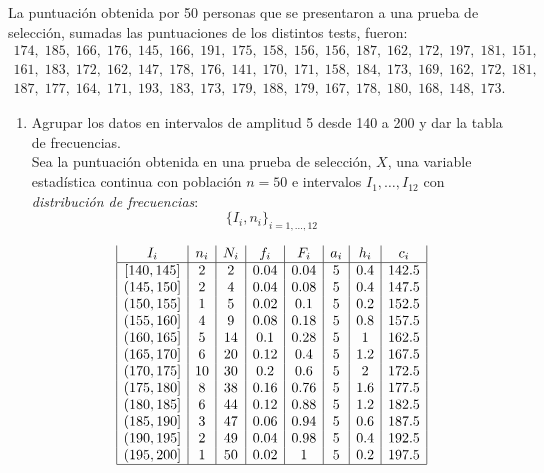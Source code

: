 \begin{ejercicio}
    La puntuación obtenida por 50 personas que se presentaron a una prueba de selección, sumadas las puntuaciones de los distintos tests, fueron:
    \begin{multline*}
        174,\;185,\;166,\;176,\;145,\;166,\;191,\;175,\;158,\;156,\;156,\;187,\;162,\;172,\;197,\;181,\;151,\;\\
        161,\;183,\;172,\;162,\;147,\;178,\;176,\;141,\;170,\;171,\;158,\;184,\;173,\;169,\;162,\;172,\;181,\;\\
        187,\;177,\;164,\;171,\;193,\;183,\;173,\;179,\;188,\;179,\;167,\;178,\;180,\;168,\;148,\;173.
    \end{multline*}

    \begin{enumerate}
        \item Agrupar los datos en intervalos de amplitud 5 desde 140 a 200 y dar la tabla de frecuencias.\\
        Sea la puntuación obtenida en una prueba de selección, $X$, una variable estadística continua con población $n=50$ e intervalos $I_1, \dots, I_{12}$ con \emph{distribución de frecuencias}:
        $$\{I_i, n_i\}_{i=1, \dots, 12}$$

        \begin{equation*}
            \begin{array}{|c|c|c|c|c|c|c|c|}
                 I_i  & n_i & N_i & f_i & F_i & a_i & h_i & c_i \\  \hline
                \left[140, 145\right] & 2 & 2 & 0.04 & 0.04 & 5 & 0.4  & 142.5\\
                (145, 150] & 2 & 4 & 0.04 & 0.08 & 5 & 0.4  & 147.5\\
                (150, 155] & 1 & 5 & 0.02 & 0.1  & 5 & 0.2  & 152.5\\
                (155, 160] & 4 & 9 & 0.08 & 0.18 & 5 & 0.8  & 157.5\\
                (160, 165] & 5 & 14& 0.1  & 0.28 & 5 & 1 & 162.5\\
                (165, 170] & 6 & 20& 0.12 & 0.4  & 5 & 1.2  & 167.5\\
                (170, 175] & 10& 30& 0.2  & 0.6  & 5 & 2 & 172.5\\
                (175, 180] & 8 & 38& 0.16 & 0.76 & 5 & 1.6  & 177.5\\
                (180, 185] & 6 & 44& 0.12 & 0.88 & 5 & 1.2  & 182.5\\
                (185, 190] & 3 & 47& 0.06 & 0.94 & 5 & 0.6  & 187.5\\
                (190, 195] & 2 & 49& 0.04 & 0.98 & 5 & 0.4  & 192.5\\
                (195, 200] & 1 & 50& 0.02 & 1 & 5 & 0.2  & 197.5 \\ \hline
            \end{array}
        \end{equation*}


\end{enumerate}
\end{ejercicio}
